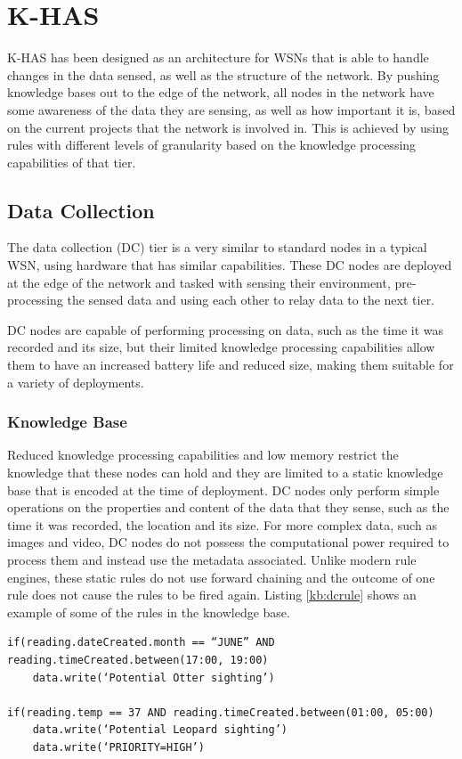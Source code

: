 	\section{K-HAS}
		K-HAS has been designed as an architecture for WSNs that is able to handle changes in the data sensed, as well as the structure of the network. By pushing knowledge bases out to the edge of the network, all nodes in the network have some awareness of the data they are sensing, as well as how important it is, based on the current projects that the network is involved in. This is achieved by using rules with different levels of granularity based on the knowledge processing capabilities of that tier.
	
	\subsection{Data Collection}\label{khas:dc}
	The data collection (DC) tier is a very similar to standard nodes in a typical WSN, using hardware that has similar capabilities. These DC nodes are deployed at the edge of the network and tasked with sensing their environment, pre-processing the sensed data and using each other to relay data to the next tier.

	DC nodes are capable of performing processing on data, such as the time it was recorded and its size, but their limited knowledge processing capabilities allow them to have an increased battery life and reduced size, making them suitable for a variety of deployments.

	\subsubsection{Knowledge Base}
	Reduced knowledge processing capabilities and low memory restrict the knowledge that these nodes can hold and they are limited to a static knowledge base that is encoded at the time of deployment. DC nodes only perform simple operations on the properties and content of the data that they sense, such as the time it was recorded, the location and its size. For more complex data, such as images and video, DC nodes do not possess the computational power required to process them and instead use the metadata associated.
	Unlike modern rule engines, these static rules do not use forward chaining and the outcome of one rule does not cause the rules to be fired again. Listing \ref{kb:dcrule} shows an example of some of the rules in the knowledge base.

\begin{lstlisting}[breaklines=true, caption=Example DC Node Rules]
if(reading.dateCreated.month == “JUNE” AND reading.timeCreated.between(17:00, 19:00)
	data.write(‘Potential Otter sighting’)

if(reading.temp == 37 AND reading.timeCreated.between(01:00, 05:00)
	data.write(‘Potential Leopard sighting’)
	data.write(‘PRIORITY=HIGH’)
\end{lstlisting}

